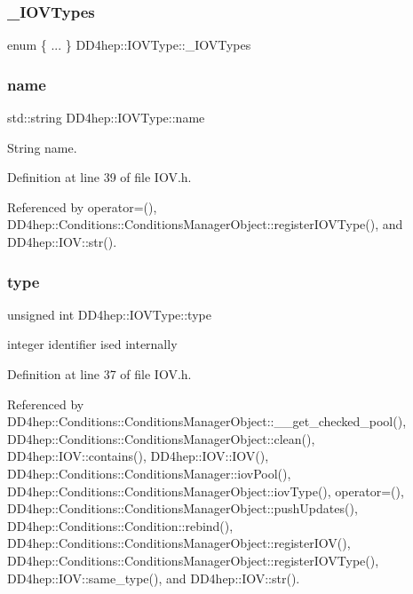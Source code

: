 \subsubsection{\texorpdfstring{\+\_\+\+I\+O\+V\+Types}{\_IOVTypes}}
{\footnotesize\ttfamily enum \{ ... \}   D\+D4hep\+::\+I\+O\+V\+Type\+::\+\_\+\+I\+O\+V\+Types}

\hypertarget{class_d_d4hep_1_1_i_o_v_type_ac4fa3d6c589f183137625501e757234e}{}\label{class_d_d4hep_1_1_i_o_v_type_ac4fa3d6c589f183137625501e757234e} 
\subsubsection{\texorpdfstring{name}{name}}
{\footnotesize\ttfamily std\+::string D\+D4hep\+::\+I\+O\+V\+Type\+::name}



String name. 



Definition at line 39 of file I\+O\+V.\+h.



Referenced by operator=(), D\+D4hep\+::\+Conditions\+::\+Conditions\+Manager\+Object\+::register\+I\+O\+V\+Type(), and D\+D4hep\+::\+I\+O\+V\+::str().

\hypertarget{class_d_d4hep_1_1_i_o_v_type_a8387532d69591a4379b8f84fa2302c5a}{}\label{class_d_d4hep_1_1_i_o_v_type_a8387532d69591a4379b8f84fa2302c5a} 
\subsubsection{\texorpdfstring{type}{type}}
{\footnotesize\ttfamily unsigned int D\+D4hep\+::\+I\+O\+V\+Type\+::type}



integer identifier ised internally 



Definition at line 37 of file I\+O\+V.\+h.



Referenced by D\+D4hep\+::\+Conditions\+::\+Conditions\+Manager\+Object\+::\+\_\+\+\_\+get\+\_\+checked\+\_\+pool(), D\+D4hep\+::\+Conditions\+::\+Conditions\+Manager\+Object\+::clean(), D\+D4hep\+::\+I\+O\+V\+::contains(), D\+D4hep\+::\+I\+O\+V\+::\+I\+O\+V(), D\+D4hep\+::\+Conditions\+::\+Conditions\+Manager\+::iov\+Pool(), D\+D4hep\+::\+Conditions\+::\+Conditions\+Manager\+Object\+::iov\+Type(), operator=(), D\+D4hep\+::\+Conditions\+::\+Conditions\+Manager\+Object\+::push\+Updates(), D\+D4hep\+::\+Conditions\+::\+Condition\+::rebind(), D\+D4hep\+::\+Conditions\+::\+Conditions\+Manager\+Object\+::register\+I\+O\+V(), D\+D4hep\+::\+Conditions\+::\+Conditions\+Manager\+Object\+::register\+I\+O\+V\+Type(), D\+D4hep\+::\+I\+O\+V\+::same\+\_\+type(), and D\+D4hep\+::\+I\+O\+V\+::str().



